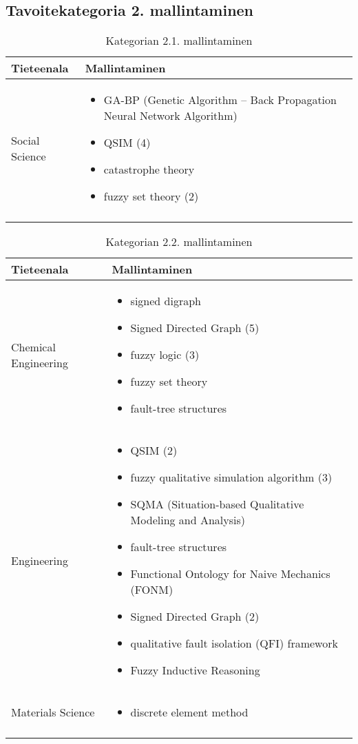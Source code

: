 \documentclass[utf8]{gradu3}
\begin{document}
\subsection{Tavoitekategoria 2. mallintaminen}

\begin{longtable}[h]{|p{5cm}|p{8cm}|}
    \hline
    \textbf{Tieteenala}    &    \textbf{Mallintaminen}\\
    \hline
    Social Science & \begin{itemize}
        \item GA-BP (Genetic Algorithm – Back Propagation Neural Network Algorithm)
        \item QSIM (4)
        \item catastrophe theory
        \item fuzzy set theory (2)
    \end{itemize} \\
    \hline
    \caption{Kategorian 2.1. mallintaminen}
    \label{table:Kategorian 2.1. mallintaminen}
\end{longtable}

\begin{longtable}[h]{|p{5cm}|p{8cm}|}
    \hline
    \textbf{Tieteenala}    &    \textbf{Mallintaminen}\\
    \hline
    Chemical Engineering & \begin{itemize}
        \item signed digraph
        \item Signed Directed Graph (5)
        \item fuzzy logic (3)
        \item fuzzy set theory
        \item fault-tree structures
    \end{itemize} \\
    \hline
    Engineering & \begin{itemize}
        \item QSIM (2)
        \item fuzzy qualitative simulation algorithm (3)
        \item SQMA (Situation-based Qualitative Modeling and Analysis)
        \item fault-tree structures
        \item Functional Ontology for Naive Mechanics (FONM)
        \item Signed Directed Graph (2)
        \item qualitative fault isolation (QFI) framework
        \item Fuzzy Inductive Reasoning
    \end{itemize} \\
    \hline
    Materials Science & \begin{itemize}
        \item discrete element method
    \end{itemize} \\
    \hline
    \caption{Kategorian 2.2. mallintaminen}
    \label{table:Kategorian 2.2. mallintaminen}
\end{longtable}
\end{document}

